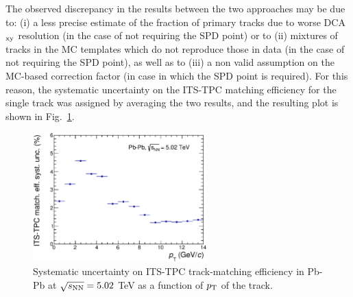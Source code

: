 The observed discrepancy in the results between the two approaches 
may be due to: (i) a less precise estimate
of the fraction of primary tracks due to worse DCA$_{\rm xy}$ resolution (in the case of not requiring the SPD point) or to (ii) 
mixtures of tracks in the MC templates which do not reproduce those in data (in the case of not requiring the SPD point), as well as
to (iii) a non valid assumption on the MC-based correction factor (in case in which 
the SPD point is required). For this reason, the systematic 
uncertainty on the ITS-TPC matching efficiency for the single track was
assigned by averaging the two results, and the resulting plot is shown in Fig.~\ref{fig:systME_AA}.\\
\begin{figure}
\centering
 \includegraphics[width=0.6\textwidth]{FigCap5/MatchEffSyst_LHC15o_16g1abc_wcutV0multTPCout_wTOFbc_AverITSTPCtracks.eps}
 \caption{Systematic uncertainty on ITS-TPC track-matching efficiency in Pb-Pb at $\sqrt{s_{\rm NN}}=5.02$ TeV as a function of $p_{\rm T}$ of the track.}
 \label{fig:systME_AA}
\end{figure}


